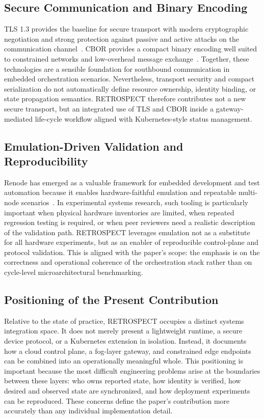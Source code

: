 \subsection{Secure Communication and Binary Encoding}
TLS 1.3 provides the baseline for secure transport with modern cryptographic negotiation and strong protection against passive and active attacks on the communication channel~\cite{rfc8446}. CBOR provides a compact binary encoding well suited to constrained networks and low-overhead message exchange~\cite{rfc8949}. Together, these technologies are a sensible foundation for southbound communication in embedded orchestration scenarios. Nevertheless, transport security and compact serialization do not automatically define resource ownership, identity binding, or state propagation semantics. RETROSPECT therefore contributes not a new secure transport, but an integrated use of TLS and CBOR inside a gateway-mediated life-cycle workflow aligned with Kubernetes-style status management.

\subsection{Emulation-Driven Validation and Reproducibility}
Renode has emerged as a valuable framework for embedded development and test automation because it enables hardware-faithful emulation and repeatable multi-node scenarios~\cite{renode}. In experimental systems research, such tooling is particularly important when physical hardware inventories are limited, when repeated regression testing is required, or when peer reviewers need a realistic description of the validation path. RETROSPECT leverages emulation not as a substitute for all hardware experiments, but as an enabler of reproducible control-plane and protocol validation. This is aligned with the paper's scope: the emphasis is on the correctness and operational coherence of the orchestration stack rather than on cycle-level microarchitectural benchmarking.

\subsection{Positioning of the Present Contribution}
Relative to the state of practice, RETROSPECT occupies a distinct systems integration space. It does not merely present a lightweight runtime, a secure device protocol, or a Kubernetes extension in isolation. Instead, it documents how a cloud control plane, a fog-layer gateway, and constrained edge endpoints can be combined into an operationally meaningful whole. This positioning is important because the most difficult engineering problems arise at the boundaries between these layers: who owns reported state, how identity is verified, how desired and observed state are synchronized, and how deployment experiments can be reproduced. These concerns define the paper's contribution more accurately than any individual implementation detail.
